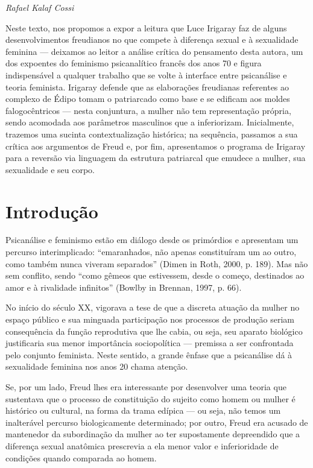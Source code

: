 \begin{flushright}
\emph{Rafael Kalaf Cossi}
\end{flushright}

Neste texto, nos propomos a expor a leitura que Luce Irigaray faz de
alguns desenvolvimentos freudianos no que compete à diferença sexual e à
sexualidade feminina --- deixamos ao leitor a análise crítica do
pensamento desta autora, um dos expoentes do feminismo psicanalítico
francês dos anos 70 e figura indispensável a qualquer trabalho que se
volte à interface entre psicanálise e teoria feminista. Irigaray defende
que as elaborações freudianas referentes ao complexo de Édipo tomam o
patriarcado como base e se edificam aos moldes falogocêntricos --- nesta
conjuntura, a mulher não tem representação própria, sendo acomodada aos
parâmetros masculinos que a inferiorizam. Inicialmente, trazemos uma
sucinta contextualização histórica; na sequência, passamos a sua crítica
aos argumentos de Freud e, por fim, apresentamos o programa de Irigaray
para a reversão via linguagem da estrutura patriarcal que emudece a
mulher, sua sexualidade e seu corpo.

\section{Introdução}

Psicanálise e feminismo estão em diálogo desde os primórdios e
apresentam um percurso interimplicado: ``emaranhados, não apenas
constituíram um ao outro, como também nunca viveram separados'' (Dimen
in Roth, 2000, p. 189). Mas não sem conflito, sendo ``como gêmeos que
estivessem, desde o começo, destinados ao amor e à rivalidade
infinitos'' (Bowlby in Brennan, 1997, p. 66).

No início do século XX, vigorava a tese de que a discreta atuação da
mulher no espaço público e sua minguada participação nos processos de
produção seriam consequência da função reprodutiva que lhe cabia, ou
seja, seu aparato biológico justificaria sua menor importância
sociopolítica --- premissa a ser confrontada pelo conjunto feminista.
Neste sentido, a grande ênfase que a psicanálise dá à sexualidade
feminina nos anos 20 chama atenção.

Se, por um lado, Freud lhes era interessante por desenvolver uma teoria
que sustentava que o processo de constituição do sujeito como homem ou
mulher é histórico ou cultural, na forma da trama edípica --- ou seja,
não temos um inalterável percurso biologicamente determinado; por outro,
Freud era acusado de mantenedor da subordinação da mulher ao ter
supostamente depreendido que a diferença sexual anatômica prescrevia a
ela menor valor e inferioridade de condições quando comparada ao homem.

